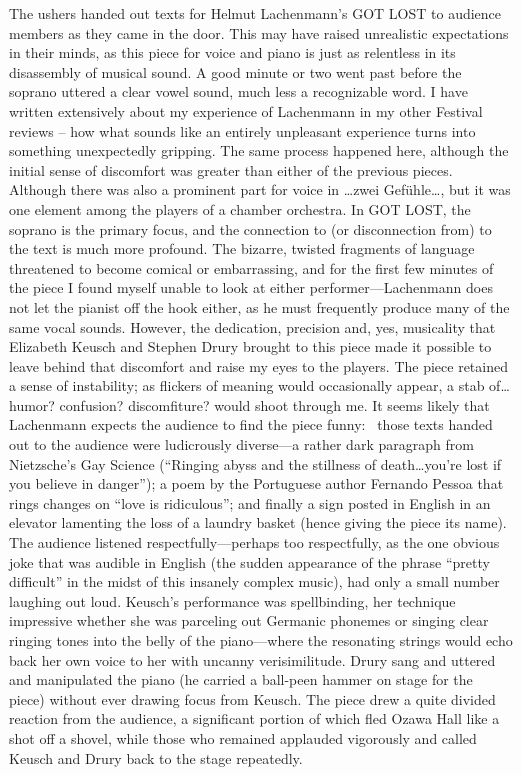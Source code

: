 The ushers handed out texts for Helmut Lachenmann’s GOT LOST to audience members as they came in the door. This may have raised unrealistic expectations in their minds, as this piece for voice and piano is just as relentless in its disassembly of musical sound. A good minute or two went past before the soprano uttered a clear vowel sound, much less a recognizable word. I have written extensively about my experience of Lachenmann in my other Festival reviews -- how what sounds like an entirely unpleasant experience turns into something unexpectedly gripping. The same process happened here, although the initial sense of discomfort was greater than either of the previous pieces. Although there was also a prominent part for voice in …zwei Gefühle…, but it was one element among the players of a chamber orchestra. In GOT LOST, the soprano is the primary focus, and the connection to (or disconnection from) to the text is much more profound. The bizarre, twisted fragments of language threatened to become comical or embarrassing, and for the first few minutes of the piece I found myself unable to look at either performer—Lachenmann does not let the pianist off the hook either, as he must frequently produce many of the same vocal sounds. However, the dedication, precision and, yes, musicality that Elizabeth Keusch and Stephen Drury brought to this piece made it possible to leave behind that discomfort and raise my eyes to the players. The piece retained a sense of instability; as flickers of meaning would occasionally appear, a stab of… humor? confusion? discomfiture? would shoot through me. It seems likely that Lachenmann expects the audience to find the piece funny:  those texts handed out to the audience were ludicrously diverse—a rather dark paragraph from Nietzsche’s Gay Science (“Ringing abyss and the stillness of death…you’re lost if you believe in danger”); a poem by the Portuguese author Fernando Pessoa that rings changes on “love is ridiculous”; and finally a sign posted in English in an elevator lamenting the loss of a laundry basket (hence giving the piece its name). The audience listened respectfully—perhaps too respectfully, as the one obvious joke that was audible in English (the sudden appearance of the phrase “pretty difficult” in the midst of this insanely complex music), had only a small number laughing out loud. Keusch’s performance was spellbinding, her technique impressive whether she was parceling out Germanic phonemes or singing clear ringing tones into the belly of the piano—where the resonating strings would echo back her own voice to her with uncanny verisimilitude. Drury sang and uttered and manipulated the piano (he carried a ball-peen hammer on stage for the piece) without ever drawing focus from Keusch. The piece drew a quite divided reaction from the audience, a significant portion of which fled Ozawa Hall like a shot off a shovel, while those who remained applauded vigorously and called Keusch and Drury back to the stage repeatedly.
